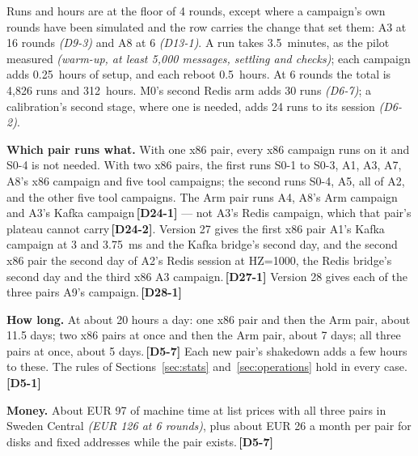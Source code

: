 \documentclass[11pt]{article}
\newcommand{\gl}[1]{{\color{soft}\itshape\small (#1)}}
\newcommand{\chg}[1]{\,{\color{chgcol}\bfseries\footnotesize[#1]}}
\newcommand{\chgold}[1]{\,{\color{oldcol}\bfseries\footnotesize[#1]}}
\begin{document}
Runs and hours are at the floor of 4 rounds, except where a campaign's own rounds have been
simulated and the row carries the change that set them: A3 at 16 rounds \gl{D9-3} and A8 at 6
\gl{D13-1}. A run takes 3.5~minutes, as the pilot measured \gl{warm-up, at least 5,000 messages, settling and checks}; each campaign adds 0.25~hours of setup, and each reboot 0.5~hours. At 6 rounds the total is 4,826 runs and 312~hours. M0's second Redis arm adds 30 runs \gl{D6-7}; a calibration's second stage, where one is needed, adds 24 runs to its session \gl{D6-2}.

\textbf{Which pair runs what.} With one x86 pair, every x86 campaign runs on it and S0-4 is not needed. With two x86 pairs, the first runs S0-1 to S0-3, A1, A3, A7, A8's x86 campaign and five tool campaigns; the second runs S0-4, A5, all of A2, and the other five tool campaigns. The Arm pair runs A4, A8's Arm campaign and A3's Kafka campaign\chgold{D24-1} --- not A3's Redis campaign, which that pair's plateau cannot carry\chgold{D24-2}. Version 27 gives the first x86 pair A1's Kafka campaign at 3 and 3.75~ms and the Kafka bridge's second day, and the second x86 pair the second day of A2's Redis session at HZ=1000, the Redis bridge's second day and the third x86 A3 campaign.\chgold{D27-1} Version 28 gives each of the three pairs A9's campaign.\chg{D28-1}

\textbf{How long.} At about 20 hours a day: one x86 pair and then the Arm pair, about 11.5 days; two x86 pairs at once and then the Arm pair, about 7 days; all three pairs at once, about 5 days.\chgold{D5-7} Each new pair's shakedown adds a few hours to these. The rules of Sections~\ref{sec:stats} and~\ref{sec:operations} hold in every case.\chgold{D5-1}

\textbf{Money.} About EUR 97 of machine time at list prices with all three pairs in Sweden Central \gl{EUR 126 at 6 rounds}, plus about EUR 26 a month per pair for disks and fixed addresses while the pair exists.\chgold{D5-7}
\end{document}
